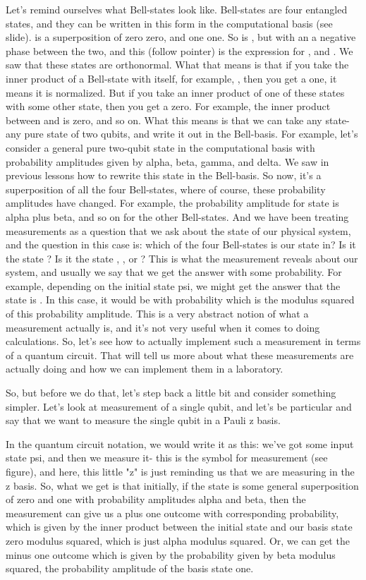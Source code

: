 Let's remind ourselves what Bell-states look like.  Bell-states are four entangled states, and they can be written in this form in the computational basis (see slide). \ket{\Phi^+} is a superposition of zero zero, and one one. So is \ket{\Phi^-}, but with an a negative phase between the two, and this (follow pointer) is the expression for \ket{\Psi^+}, and \ket{\Psi^-}. We saw that these states are orthonormal. What that means is that if you take the inner product of a Bell-state with itself, for example, \ket{\Phi^+}, then you get a one, it means it is normalized. But if you take an inner product of one of these states with some other state, then you get a zero. For example, the inner product between \ket{\Phi^-} and \ket{\Phi^+} is zero, and so on. What this means is that we can take any state- any pure state of two qubits, and write it out in the Bell-basis. For example, let's consider a general pure two-qubit state in the computational basis with probability amplitudes given by alpha, beta, gamma, and delta. We saw in previous lessons how to rewrite this state in the Bell-basis. So now, it's a superposition of all the four Bell-states, where of course, these probability amplitudes have changed. For example, the probability amplitude for state \ket{\Phi^+} is alpha plus beta, and so on for the other Bell-states. And we have been treating measurements as a question that we ask about the state of our physical system, and the question in this case is: which of the four Bell-states is our state in? Is it the state \ket{\Phi^+}? Is it the state \ket{\Phi^-}, \ket{\Psi^+}, or \ket{\Psi^-}? This is what the measurement reveals about our system, and usually we say that we get the answer with some probability. For example, depending on the initial state psi, we might get the answer that the state is \ket{\Phi^+}. In this case, it would be with probability which is the modulus squared of this probability amplitude. This is a very abstract notion of what a measurement actually is, and it's not very useful when it comes to doing calculations. So, let's see how to actually implement such a measurement in terms of a quantum circuit. That will tell us more about what these measurements are actually doing and how we can implement them in a laboratory.

So, but before we do that, let's step back a little bit and consider something simpler. Let's look at measurement of a single qubit, and let's be particular and say that we want to measure the single qubit in a Pauli z basis.

In the quantum circuit notation, we would write it as this: we've got some input state psi, and then we measure it- this is the symbol for measurement (see figure), and here, this little "z" is just reminding us that we are measuring in the z basis. So, what we get is that initially, if the state is some general superposition of zero and one with probability amplitudes alpha and beta, then the measurement can give us a plus one outcome with corresponding probability, which is given by the inner product between the initial state and our basis state zero modulus squared, which is just alpha modulus squared. Or, we can get the minus one outcome which is given by the probability given by beta modulus squared, the probability amplitude of the basis state one.

